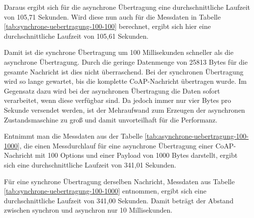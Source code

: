 Daraus ergibt sich für die asynchrone Übertragung eine durchschnittliche Laufzeit von 105,71 Sekunden. Wird diese nun auch für die Messdaten in Tabelle \ref{tab:synchrone-uebertragung-100-100} berechnet, ergibt sich hier eine durchschnittliche Laufzeit von 105,61 Sekunden.

Damit ist die synchrone Übertragung um 100 Millisekunden schneller als die asynchrone Übertragung. Durch die geringe Datenmenge von 25813 Bytes für die gesamte Nachricht ist dies nicht überraschend. Bei der synchronen Übertragung wird so lange gewartet, bis die komplette CoAP-Nachricht übertragen wurde. Im Gegensatz dazu wird bei der asynchronen Übertragung die Daten sofort verarbeitet, wenn diese verfügbar sind. Da jedoch immer nur vier Bytes pro Sekunde versendet werden, ist der Mehraufwand zum Erzeugen der asynchronen Zustandsmaschine zu groß und damit unvorteilhaft für die Performanz.

\begin{table}[h]
    \caption{Synchrone Übertragung mit 100 Options und mit einer Payload von 100 Bytes.}
    \label{tab:synchrone-uebertragung-100-100}
\end{table}

Entnimmt man die Messdaten aus der Tabelle \ref{tab:asynchrone-uebertragung-100-1000}, die einen Messdurchlauf für eine asynchrone Übertragung einer CoAP-Nachricht mit 100 Options und einer Payload von 1000 Bytes darstellt, ergibt sich eine durchschnittliche Laufzeit von 341,01 Sekunden.

Für eine synchrone Übertragung derselben Nachricht, Messdaten aus Tabelle \ref{tab:synchrone-uebertragung-100-1000} entnommen, ergibt sich eine durchschnittliche Laufzeit von 341,00 Sekunden. Damit beträgt der Abstand zwischen synchron und asynchron nur 10 Millisekunden.

